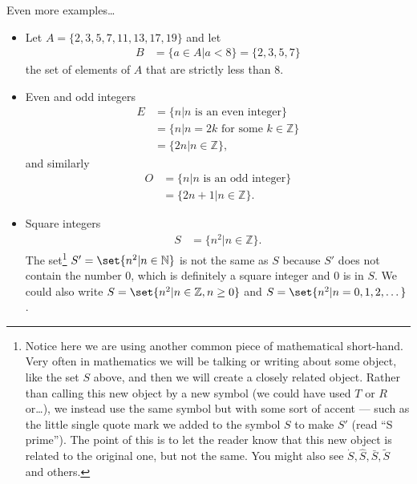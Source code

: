 \begin{eg}\label{eg_0_3_1}
  Even more examples\dots
\begin{itemize}
 \item Let $A = \{2,3,5,7,11,13,17,19\}$ and let
 \begin{align*}
  B &= \{ a \in A | a<8\} = \{2,3,5,7\}
  \end{align*}
  the set of elements of $A$ that are strictly less than 8.

\item Even and odd integers
\begin{align*}
E &= \{ n | n \mbox{ is an even integer} \} \\
 &= \{n | n =2k \mbox{ for some $k \in \mathbb{Z}$} \} \\
 &= \{2n | n \in \mathbb{Z}\},
\end{align*}
and similarly
\begin{align*}
  O &= \{ n | n \mbox{ is an odd integer} \} \\
  &= \{2n+1 | n \in \mathbb{Z}\}.
\end{align*}

\item Square integers
\begin{align*}
  S &= \{n^2 | n \in \mathbb{Z}\}.
\end{align*}
The set\footnote{Notice here we are using another common piece of mathematical
short-hand. Very often in mathematics we will be talking or writing about some
object, like the set $S$ above, and then we will create a closely related
object. Rather than calling this new object by a new symbol (we could have used
$T$ or $R$ or\dots), we instead use the same symbol but with some sort of accent
--- such as the little single quote mark we added to the symbol $S$ to make
$S'$ (read ``S prime''). The point of this is to let the reader know that this
new object is related to the original one, but not the same. You might also see
$\dot{S}, \hat{S}, \bar{S}, \tilde{S}$ and others.} $S'= \set{n^2 | n \in
\mathbb{N}}$ is not the same as $S$ because $S'$ does not contain the number
$0$, which is definitely a square integer and $0$ is in $S$. We could also write
$S = \set{n^2 | n \in \mathbb{Z}, n \geq 0}$ and $S=\set{n^2 | n=0,1,2,\dots}$.
\end{itemize}
\end{eg}


